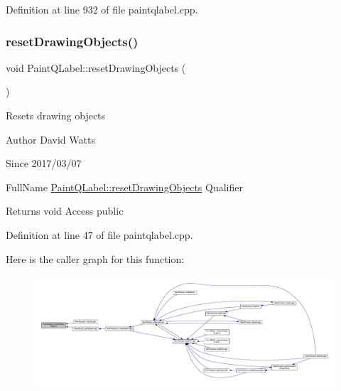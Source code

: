 Definition at line 932 of file paintqlabel.\+cpp.

\mbox{\label{class_paint_q_label_aeac060e87e6671f65fb3a5ff4e3f15f4}} 
\subsubsection{\texorpdfstring{reset\+Drawing\+Objects()}{resetDrawingObjects()}}
{\footnotesize\ttfamily void Paint\+Q\+Label\+::reset\+Drawing\+Objects (\begin{DoxyParamCaption}{ }\end{DoxyParamCaption})}

Resets drawing objects

\begin{DoxyAuthor}{Author}
David Watts 
\end{DoxyAuthor}
\begin{DoxySince}{Since}
2017/03/07
\end{DoxySince}
Full\+Name \hyperlink{class_paint_q_label_aeac060e87e6671f65fb3a5ff4e3f15f4}{Paint\+Q\+Label\+::reset\+Drawing\+Objects} Qualifier \begin{DoxyReturn}{Returns}
void Access public 
\end{DoxyReturn}


Definition at line 47 of file paintqlabel.\+cpp.

Here is the caller graph for this function\+:
\nopagebreak
\begin{figure}[H]
\begin{center}
\leavevmode
\includegraphics[width=350pt]{class_paint_q_label_aeac060e87e6671f65fb3a5ff4e3f15f4_icgraph}
\end{center}
\end{figure}
\mbox{\label{class_paint_q_label_aec6344135e411064b52d5376650b48ef}} 
